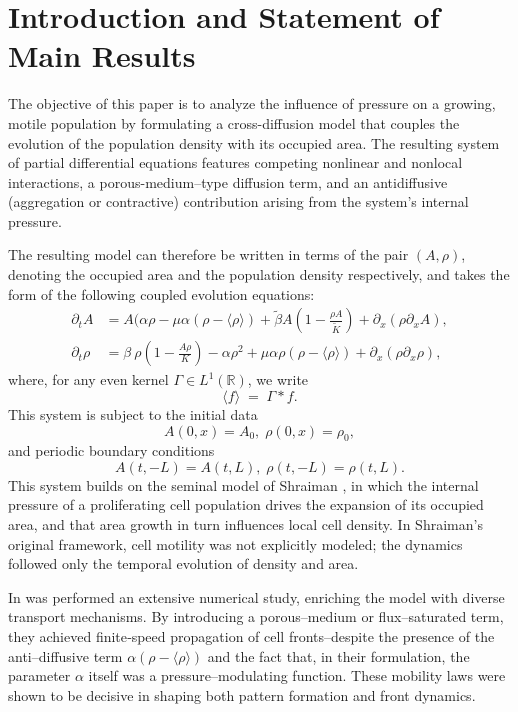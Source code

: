 \documentclass[12pt]{amsart}
\begin{document}
	\maketitle
    \tableofcontents
    
    \section{Introduction and Statement of Main Results}
	\label{sec:1}
	
The objective of this paper is to analyze the influence of pressure on a growing, motile population by formulating a cross-diffusion model that couples the evolution of the population density with its occupied area. The resulting system of partial differential equations features competing nonlinear and nonlocal interactions, a porous-medium–type diffusion term, and an antidiffusive (aggregation or contractive) contribution arising from the system’s internal pressure.

The resulting model can therefore be written in terms of the pair $(A,\rho)$, denoting the occupied area and the population density respectively, and takes the form of the following coupled evolution equations:
	  \begin{equation}\label{Original}		
		\begin{aligned}
			\partial_t A&= A(\alpha\rho-\mu\alpha(\rho-\langle \rho \rangle)+\widetilde{\beta}A\left(1-\frac{\rho A}{\widetilde{K}} \right)+\partial_x(\rho \partial_x A) ,\\
			\partial_t\rho&=\beta\ \rho\left(1-\frac{A\rho}{K} \right)-\alpha\rho^2+\mu\alpha\rho(\rho-\langle \rho\rangle)+\partial_x(\rho \partial_{x}\rho),
		\end{aligned}
	\end{equation}
    where, for any even kernel $\Gamma\in L^1(\mathbb{R})$, we write
\[
\langle f\rangle \;=\;\Gamma * f.
\]
This system is subject to the initial data
\[
			 A(0,x)  =A_0,\;\rho(0,x)=\rho_0,
\]
and periodic boundary conditions
\[
			 A(t,-L) =A(t,L),\;\rho(t,-L)=\rho(t,L).
\]
This system builds on the seminal model of Shraiman \cite{Shraiman2005}, in which the internal pressure of a proliferating cell population drives the expansion of its occupied area, and that area growth in turn influences local cell density.  In Shraiman's original framework, cell motility was not explicitly modeled; the dynamics followed only the temporal evolution of density and area.

In \cite{Blanco2021} was performed an extensive numerical study, enriching the model with diverse transport mechanisms. By introducing a porous--medium or flux--saturated term, they achieved finite‐speed propagation of cell fronts--despite the presence of the anti--diffusive term $ \alpha(\rho - \langle\rho\rangle)$ and the fact that, in their formulation, the parameter $\alpha$ itself was a pressure--modulating function. These mobility laws were shown to be decisive in shaping both pattern formation and front dynamics.
\end{document}
